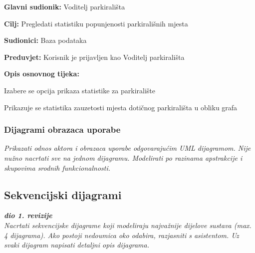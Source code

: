                         \noindent {}
					\begin{packed_item}
	
						\item \textbf{Glavni sudionik: }Voditelj parkirališta
						\item  \textbf{Cilj:} Pregledati statistiku popunjenosti parkirališnih mjesta
						\item  \textbf{Sudionici:} Baza podataka
						\item  \textbf{Preduvjet:} Korisnik je prijavljen kao Voditelj parkirališta
						\item  \textbf{Opis osnovnog tijeka:}
						
						\item[] \begin{packed_enum}
	
							\item Izabere se opcija prikaza statistike za parkiralište
							\item Prikazuje se statistika zauzetosti mjesta dotičnog parkirališta u obliku grafa
							
							
						\end{packed_enum}

					\end{packed_item}

				
					
				\subsubsection{Dijagrami obrazaca uporabe}
					
					\textit{Prikazati odnos aktora i obrazaca uporabe odgovarajućim UML dijagramom. Nije nužno nacrtati sve na jednom dijagramu. Modelirati po razinama apstrakcije i skupovima srodnih funkcionalnosti.}
				\eject		
				
			\subsection{Sekvencijski dijagrami}
				
				\textbf{\textit{dio 1. revizije}}\\
				
				\textit{Nacrtati sekvencijske dijagrame koji modeliraju najvažnije dijelove sustava (max. 4 dijagrama). Ako postoji nedoumica oko odabira, razjasniti s asistentom. Uz svaki dijagram napisati detaljni opis dijagrama.}
				\eject
	
